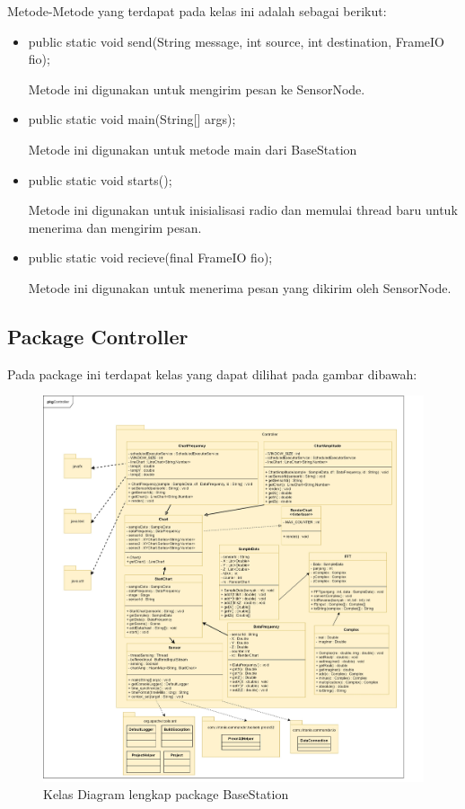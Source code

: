 Metode-Metode yang terdapat pada kelas ini adalah sebagai berikut:

\begin{itemize}
    \item public static void send(String message, int source, int destination, FrameIO fio);
    
    Metode ini digunakan untuk mengirim pesan ke SensorNode.
    
    \item public static void main(String[] args);
    
    Metode ini digunakan untuk metode main dari BaseStation
    
    \item public static void starts();
    
    Metode ini digunakan untuk inisialisasi radio dan memulai thread baru untuk menerima dan mengirim pesan.
    
    \item public static void recieve(final FrameIO fio);
    
    Metode ini digunakan untuk menerima pesan yang dikirim oleh SensorNode.
    
\end{itemize}


\subsection{Package Controller}
Pada package ini terdapat kelas yang dapat dilihat pada gambar dibawah:
\begin{figure}[H] 
	\centering  
	\includegraphics[scale=0.2]{Gambar/Controller Package/Controller-Controller_class.jpg}
	\caption[Kelas Diagram lengkap package Controller]{Kelas Diagram lengkap package BaseStation}
	\label{fig:controller} 
\end{figure}


